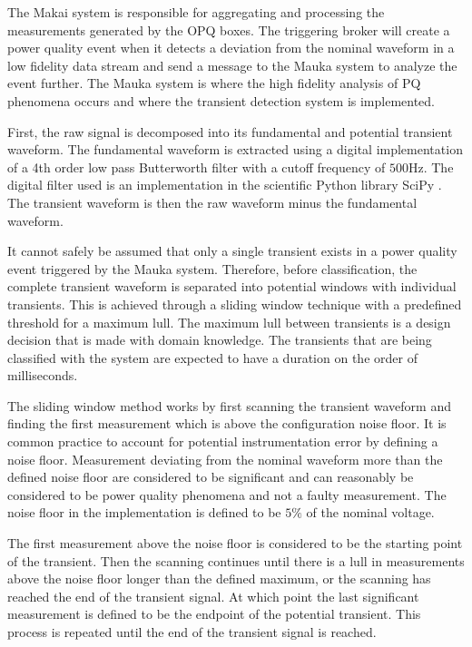 \documentclass[10pt, conference, compsocconf]{IEEEtran}
\begin{document}
The Makai system is responsible for aggregating and processing the measurements generated by the OPQ boxes. The triggering broker will create a power quality event when it detects a deviation from the nominal waveform in a low fidelity data stream and send a message to the Mauka system to analyze the event further. The Mauka system is where the high fidelity analysis of PQ phenomena occurs and where the transient detection system is implemented.

First, the raw signal is decomposed into its fundamental and potential transient waveform. The fundamental waveform is extracted using a digital implementation of a 4th order low pass Butterworth filter with a cutoff frequency of $500$Hz. The digital filter used is an implementation in the scientific Python library SciPy \cite{scipy:2019}. The transient waveform is then the raw waveform minus the fundamental waveform.

It cannot safely be assumed that only a single transient exists in a power quality event triggered by the Mauka system. Therefore, before classification, the complete transient waveform is separated into potential windows with individual transients. This is achieved through a sliding window technique with a predefined threshold for a maximum lull. The maximum lull between transients is a design decision that is made with domain knowledge. The transients that are being classified with the system are expected to have a duration on the order of milliseconds.

The sliding window method works by first scanning the transient waveform and finding the first measurement which is above the configuration noise floor. It is common practice to account for potential instrumentation error by defining a noise floor. Measurement deviating from the nominal waveform more than the defined noise floor are considered to be significant and can reasonably be considered to be power quality phenomena and not a faulty measurement. The noise floor in the implementation is defined to be $5\%$ of the nominal voltage.

The first measurement above the noise floor is considered to be the starting point of the transient. Then the scanning continues until there is a lull in measurements above the noise floor longer than the defined maximum, or the scanning has reached the end of the transient signal. At which point the last significant measurement is defined to be the endpoint of the potential transient. This process is repeated until the end of the transient signal is reached.
\end{document}
